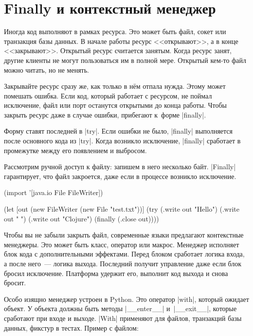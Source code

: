 \section{Finally и контекстный менеджер}

Иногда код выполняют в рамках ресурса. Это может быть файл, сокет или транзакция
базы данных. В начале работы ресурс <<открывают>>, а в конце
<<закрывают>>. Открытый ресурс считается занятым. Когда ресурс занят, другие
клиенты не могут пользоваться им в полной мере. Открытый кем-то файл можно
читать, но не менять.

Закрывайте ресурс сразу же, как только в н\"{е}м отпала нужда. Этому может
помешать ошибка. Если код, который работает с ресурсом, не поймал исключение,
файл или порт останутся открытыми до конца работы. Чтобы закрыть ресурс даже в
случае ошибки, прибегают к~форме \spverb|finally|.

Форму ставят последней в \spverb|try|. Если ошибки не было, \spverb|finally|
выполняется после основного кода из \spverb|try|. Когда возникло исключение,
\spverb|finally| сработает в промежутке между его появлением и выбросом.

Рассмотрим ручной доступ к файлу: запишем в него несколько
байт. \spverb|Finally| гарантирует, что файл закроется, даже если в процессе
возникло исключение.

\begin{english}
  \begin{clojure}
(import '[java.io File FileWriter])

(let [out (new FileWriter (new File "test.txt"))]
  (try
    (.write out "Hello")
    (.write out " ")
    (.write out "Clojure")
    (finally
      (.close out))))
  \end{clojure}
\end{english}

Чтобы вы не забыли закрыть файл, современные языки предлагают контекстные
менеджеры. Это может быть класс, оператор или макрос. Менеджер исполняет блок
кода с дополнительными эффектами. Перед блоком сработает логика входа, а после
него~--- логика выхода. Последний получит управление даже если блок бросил
исключение. Платформа удержит его, выполнит код выхода и снова бросит.


Особо изящно менеджер устроен в Python. Это оператор \spverb|with|, который
ожидает объект. У объекта должны быть методы \spverb|__enter__|
и~\spverb|__exit__|, которые сработают при входе и выходе. \spverb|With|
применяют для файлов, транзакций базы данных, фикстур в тестах. Пример с файлом:

